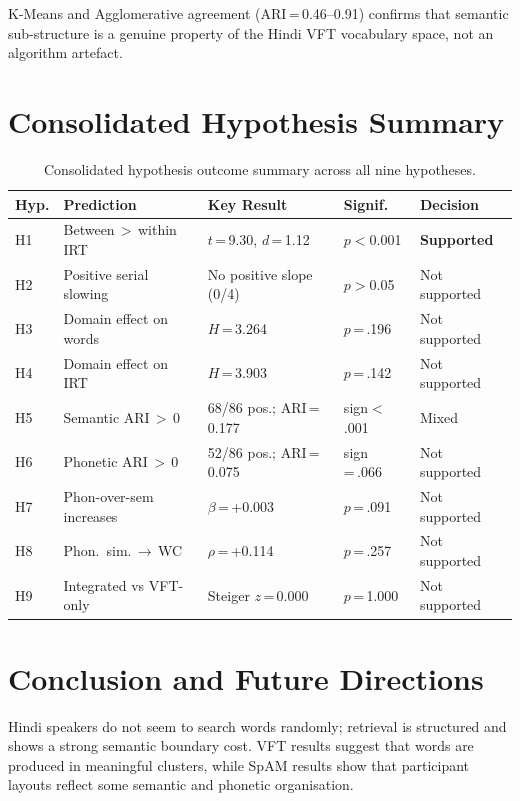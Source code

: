 \documentclass[12pt]{article}
\begin{document}
K-Means and Agglomerative agreement (ARI\,=\,0.46--0.91) confirms that semantic sub-structure is a genuine property of the Hindi VFT vocabulary space, not an algorithm artefact.

\section{Consolidated Hypothesis Summary}

\begin{table}[htbp]
\centering\small
\caption{Consolidated hypothesis outcome summary across all nine hypotheses.}
\label{tab:summary}
\begin{tabular}{p{0.6cm}p{4.5cm}p{4cm}p{1.5cm}p{2cm}}
\toprule
Hyp. & Prediction & Key Result & Signif. & Decision \\\midrule
H1 & Between\,$>$\,within IRT & $t$\,=\,9.30, $d$\,=\,1.12 & $p<$0.001 & \textbf{Supported} \\
H2 & Positive serial slowing & No positive slope (0/4) & $p>$0.05 & Not supported \\
H3 & Domain effect on words & $H$\,=\,3.264 & $p$\,=\,.196 & Not supported \\
H4 & Domain effect on IRT & $H$\,=\,3.903 & $p$\,=\,.142 & Not supported \\
H5 & Semantic ARI\,$>$\,0 & 68/86 pos.; ARI\,=\,0.177 & sign$<$.001 & Mixed \\
H6 & Phonetic ARI\,$>$\,0 & 52/86 pos.; ARI\,=\,0.075 & sign\,=\,.066 & Not supported \\
H7 & Phon-over-sem increases & $\beta$\,=\,+0.003 & $p$\,=\,.091 & Not supported \\
H8 & Phon.\ sim.\,$\to$\,WC & $\rho$\,=\,+0.114 & $p$\,=\,.257 & Not supported \\
H9 & Integrated vs VFT-only & Steiger $z$\,=\,0.000 & $p$\,=\,1.000 & Not supported \\\bottomrule
\end{tabular}
\end{table}

\section{Conclusion and Future Directions}

Hindi speakers do not seem to search words randomly; retrieval is structured and shows a strong semantic boundary cost. VFT results suggest that words are produced in meaningful clusters, while SpAM results show that participant layouts reflect some semantic and phonetic organisation.
\end{document}
